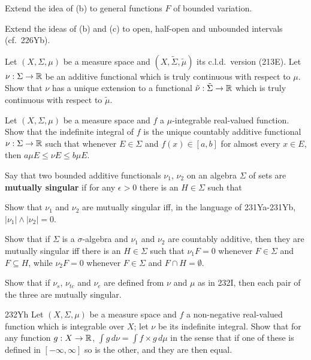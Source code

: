 { Extend the idea of (b) to general functions $F$
of bounded variation.

 Extend the ideas of (b) and (c) to open,
half-open and unbounded intervals (cf.\ 226Yb).

 Let $(X,\Sigma,\mu)$ be a measure space and
$(X,\tilde\Sigma,\tilde\mu)$ its c.l.d.\ version (213E).   Let
$\nu:\Sigma\to\Bbb R$ be an additive functional which is truly
continuous with respect to $\mu$.   Show that $\nu$ has a unique
extension to a functional $\tilde\nu:\tilde\Sigma\to\Bbb R$ which is
truly continuous with respect to $\tilde\mu$.

 Let $(X,\Sigma,\mu)$ be a measure space and $f$
a $\mu$-integrable real-valued function.   Show that the indefinite
integral of $f$ is the unique countably additive functional
$\nu:\Sigma\to\Bbb R$ such that whenever $E\in\Sigma$ and $f(x)\in[a,b]$
for almost every $x\in E$, then $a\mu E\le\nu E\le b\mu E$.

 Say that two bounded additive functionals
$\nu_1$, $\nu_2$ on an algebra $\Sigma$ of sets are {\bf mutually
singular} if for any $\epsilon>0$ there is an $H\in\Sigma$ such that



 Show that $\nu_1$ and $\nu_2$ are mutually singular iff, in
the language of 231Ya-231Yb, $|\nu_1|\wedge|\nu_2|=0$.

 Show that if $\Sigma$ is a $\sigma$-algebra and $\nu_1$ and
$\nu_2$ are countably additive, then they are mutually singular iff
there is an $H\in\Sigma$ such that $\nu_1F=0$ whenever $F\in\Sigma$ and
$F\subseteq H$, while $\nu_2F=0$ whenever $F\in\Sigma$ and
$F\cap H=\emptyset$.

 Show that if $\nu_s$, $\nu_{tc}$ and $\nu_e$ are defined
from $\nu$ and $\mu$ as in 232I, then each pair of the three are
mutually singular.

\spheader 232Yh Let $(X,\Sigma,\mu)$ be a measure space and $f$ a
non-negative real-valued function which is integrable over $X$;  let
$\nu$ be its indefinite integral.   Show that for any function
$g:X\to\Bbb R$, $\int g\,d\nu=\int f\times g\,d\mu$ in the sense that if
one of these is defined in $[-\infty,\infty]$ so is the other, and they
are then equal.   

}
